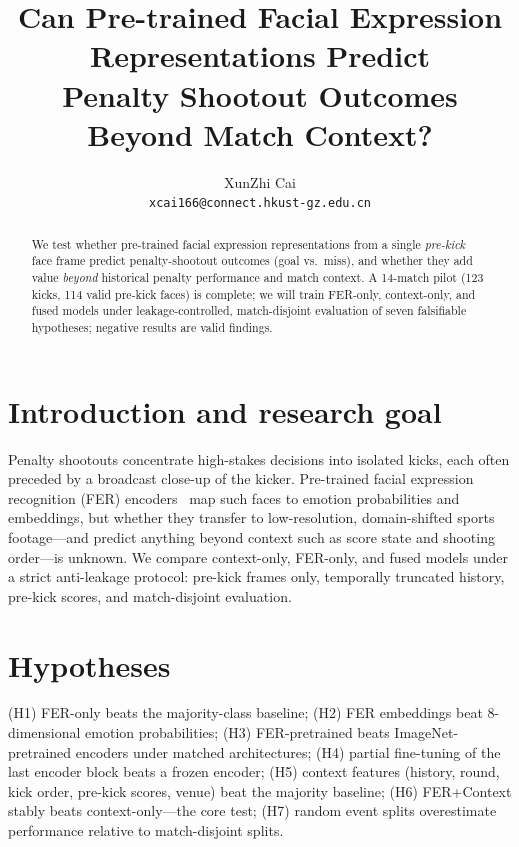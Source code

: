 \documentclass{article}
\title{Can Pre-trained Facial Expression Representations Predict\\Penalty Shootout Outcomes Beyond Match Context?}
\author{%
  XunZhi Cai \\
  \texttt{xcai166@connect.hkust-gz.edu.cn} \\
}
\begin{document}
\maketitle

\begin{abstract}
We test whether pre-trained facial expression representations from a single \emph{pre-kick} face frame predict penalty-shootout outcomes (goal vs.\ miss), and whether they add value \emph{beyond} historical penalty performance and match context. A 14-match pilot (123 kicks, 114 valid pre-kick faces) is complete; we will train FER-only, context-only, and fused models under leakage-controlled, match-disjoint evaluation of seven falsifiable hypotheses; negative results are valid findings.
\end{abstract}

\section{Introduction and research goal}
Penalty shootouts concentrate high-stakes decisions into isolated kicks, each often preceded by a broadcast close-up of the kicker. Pre-trained facial expression recognition (FER) encoders~\citep{ekman,emotieff} map such faces to emotion probabilities and embeddings, but whether they transfer to low-resolution, domain-shifted sports footage---and predict anything beyond context such as score state and shooting order---is unknown. We compare context-only, FER-only, and fused models under a strict anti-leakage protocol: pre-kick frames only, temporally truncated history, pre-kick scores, and match-disjoint evaluation.

\section{Hypotheses}
(H1) FER-only beats the majority-class baseline; (H2) FER embeddings beat 8-dimensional emotion probabilities; (H3) FER-pretrained beats ImageNet-pretrained encoders under matched architectures; (H4) partial fine-tuning of the last encoder block beats a frozen encoder; (H5) context features (history, round, kick order, pre-kick scores, venue) beat the majority baseline; (H6) FER+Context stably beats context-only---the core test; (H7) random event splits overestimate performance relative to match-disjoint splits.
\end{document}
